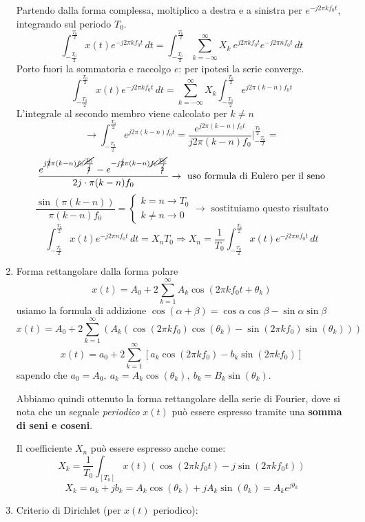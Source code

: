 \documentclass[
  paper=a4,
  ,captions=tableheading
]{scrartcl}
\begin{document}
\begin{enumerate}
  Partendo dalla forma complessa, moltiplico a destra e a sinistra per
  \(e^{-j2\pi kf_{0}t}\), integrando sul periodo \(T_0\). \[
   \int_{-\frac{T_0}{2}}^{\frac{T_0}{2}} x(t)e^{-j2\pi kf_{0}t} \,dt = \int_{-\frac{T_0}{2}}^{\frac{T_0}{2}} \sum_{k=-\infty}^{\infty} X_k \ e^{j2\pi kf_{0}t}  e^{-j2\pi nf_{0}t} \,dt
   \] Porto fuori la sommatoria e raccolgo \(e\): per ipotesi la serie
  converge. \[
   \int_{-\frac{T_0}{2}}^{\frac{T_0}{2}} x(t)e^{-j2\pi kf_{0}t} \,dt = \sum_{k=-\infty}^{\infty} X_k  \int_{-\frac{T_0}{2}}^{\frac{T_0}{2}} e^{j2\pi (k-n)f_{0}t} 
   \] L'integrale al secondo membro viene calcolato per \(k\neq n\) \[
   \to \int_{-\frac{T_0}{2}}^{\frac{T_0}{2}} e^{j2\pi (k-n)f_{0}t} = \frac{e^{j2\pi (k-n)f_{0}t}}{j2\pi (k-n)f_{0}} \Big|_{-\frac{T_0}{2}}^{\frac{T_0}{2}}=
   \] \[
   \frac{e^{j\cancel{2}\pi (k-n)\cancel{f_{0}}\frac{\cancel{T_0}}{\cancel{2}}} - e^{-j\cancel{2}\pi (k-n)\cancel{f_{0}}\frac{\cancel{T_0}}{\cancel{2}}}}{2j \cdot \pi (k-n)f_{0}} \to \text{ uso formula di Eulero per il seno}
   \] \[
   \frac{\sin (\pi (k-n))}{\pi (k-n)f_{0}} = \left\{ \begin{array}{cl}
   k=n\to T_0  \\
   k\neq n \to 0
   \end{array} \right.
   \to \text{ sostituiamo questo risultato}
   \] \[
   \int_{-\frac{T_0}{2}}^{\frac{T_0}{2}} x(t)e^{-j2\pi nf_{0}t} \,dt = X_{n}T_{0} \Rightarrow X_{n} = \frac{1}{T_0}\int_{-\frac{T_0}{2}}^{\frac{T_0}{2}} x(t)e^{-j2\pi nf_{0}t} \,dt 
   \]
\item
  Forma rettangolare dalla forma polare \[
   x(t) = A_{0} + 2 \sum_{k=1}^{\infty} A_{k} \cos(2\pi k f_{0}t + \theta_{k})
   \] usiamo la formula di addizione
  \(\cos(\alpha + \beta) = \cos\alpha\cos\beta - \sin\alpha\sin\beta\)
  \[
   x(t) = A_{0} + 2 \sum_{k=1}^{\infty} (A_{k}(\cos(2\pi k f_{0})\cos({\theta_k}) - \sin(2\pi k f_{0})\sin({\theta_k})))
   \] \[
   x(t) = a_{0} + 2 \sum_{k=1}^{\infty} [a_{k} \cos(2\pi k f_{0}) - b_{k}\sin(2\pi k f_{0})]
   \] sapendo che
  \(a_{0} = A_{0}, \ a_{k} = A_{k}\cos(\theta_k), \ b_{k} = B_{k}\sin(\theta_k)\).

  Abbiamo quindi ottenuto la forma rettangolare della serie di Fourier,
  dove si nota che un segnale \emph{periodico} \(x(t)\) può essere
  espresso tramite una \textbf{somma di seni e coseni}.

  Il coefficiente \(X_n\) può essere espresso anche come: \[
   X_k = \frac{1}{T_0} \int_{[T_0]} x(t) (\cos(2\pi kf_{0}t) - j\sin(2\pi kf_{0}t))
   \] \[
   X_k = a_k +jb_k = A_k \cos(\theta_k) + jA_k\sin(\theta_k) = A_k e^{j\theta_k}
   \]
\item
  Criterio di Dirichlet (per \(x(t)\) periodico):


\end{enumerate}
\end{document}
